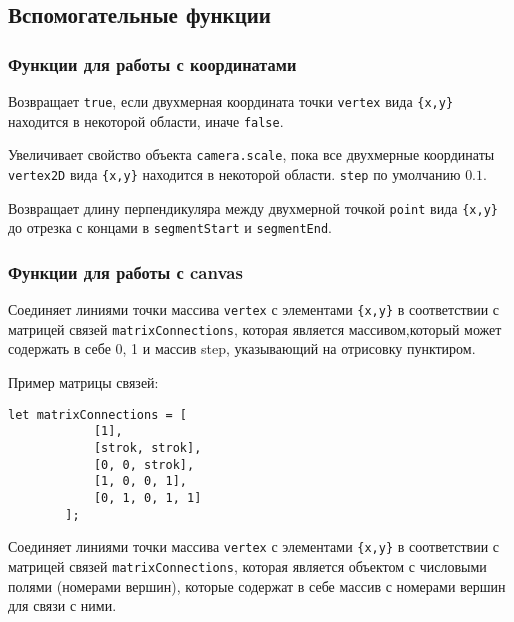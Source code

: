 \subsection{Вспомогательные функции}

\subsubsection{Функции для работы с координатами}

Возвращает \texttt{true}, если двухмерная координата точки \texttt{vertex} вида \texttt{\{x,y\}} находится в некоторой области, иначе \texttt{false}.

Увеличивает свойство объекта \texttt{camera.scale}, пока все двухмерные координаты \texttt{vertex2D} вида \texttt{\{x,y\}}  находится в некоторой области. \texttt{step} по умолчанию $0.1$.

Возвращает длину перпендикуляра между двухмерной точкой \texttt{point} вида \texttt{\{x,y\}} до отрезка с концами в \texttt{segmentStart} и \texttt{segmentEnd}.

\subsubsection{Функции для работы с canvas}

Соединяет линиями точки массива \texttt{vertex} с элементами \texttt{\{x,y\}} в соответствии с матрицей связей \texttt{matrixConnections}, которая является массивом,который может содержать в себе 0, 1 и массив step, указывающий на отрисовку пунктиром.

Пример матрицы связей:
\begin{lstlisting}[frame=none]
	let matrixConnections = [
			[1],
			[strok, strok],
			[0, 0, strok],
			[1, 0, 0, 1],
			[0, 1, 0, 1, 1]
		];
	\end{lstlisting}

Соединяет линиями точки массива \texttt{vertex} с элементами \texttt{\{x,y\}} в соответствии с матрицей связей \texttt{matrixConnections}, которая является объектом с числовыми полями (номерами вершин), которые содержат в себе массив с номерами вершин для связи с ними.

